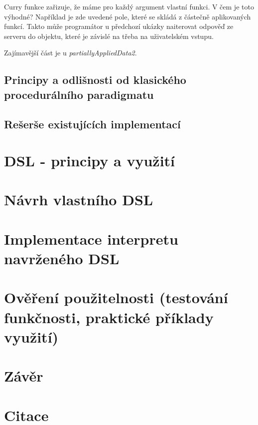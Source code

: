 \documentclass[male,czech]{kithesis}
\begin{document}
Curry funkce zařizuje, že máme pro každý argument vlastní funkci. V čem je toto výhodné?
Například je zde uvedené pole, které se skládá z částečně aplikovaných funkcí. 
Takto může programátor u předchozí ukázky naiterovat odpověď ze serveru do objektu, které je závislé na třeba na uživatelském vstupu. 

Zajímavější část je u \textit{partiallyAppliedData2}.

\section{Principy a odlišnosti od klasického procedurálního paradigmatu}

\section{Rešerše existujících implementací}

\chapter{DSL - principy a využití}

\chapter{Návrh vlastního DSL}

\chapter{Implementace interpretu navrženého DSL}

\chapter{Ověření použitelnosti (testování funkčnosti, praktické příklady využití)}

\chapter{Závěr}

\chapter{Citace}


\cite{Katuscakc}
\cite{IntroToLLVM}
\printbibliography


\appendix
\end{document}
